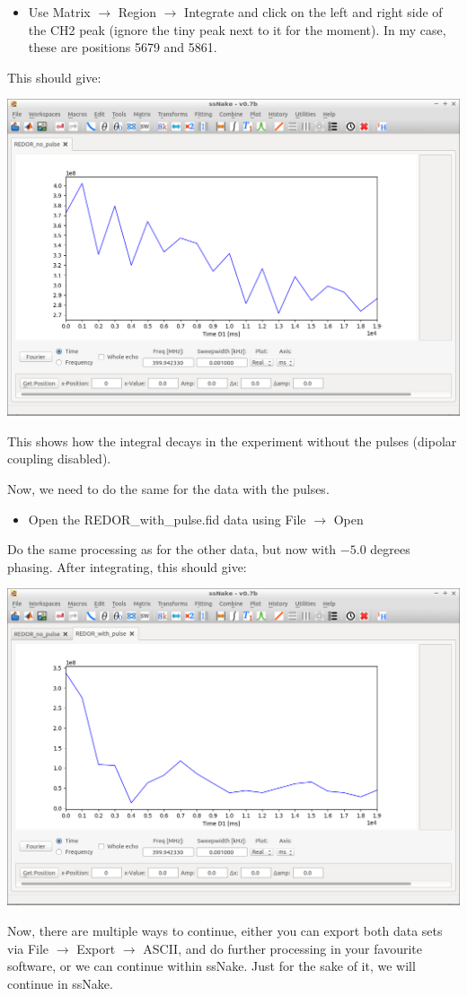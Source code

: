 \documentclass[11pt,a4paper]{article}
\begin{document}
\begin{itemize}
	\item Use Matrix $\longrightarrow$ Region $\longrightarrow$
Integrate and click on the left and right side of the CH2 peak (ignore the tiny peak next to it for
the moment). In my case, these are positions 5679 and 5861.
\end{itemize}
This should give:
\begin{center}
\includegraphics[width=0.8\linewidth]{Figs/Fig2.png}
\end{center}
This shows how the integral decays in the experiment without the pulses (dipolar coupling disabled).

Now, we need to do the same for the data with the pulses. 
\begin{itemize}
	\item Open the REDOR\_with\_pulse.fid data using File $\longrightarrow$ Open
\end{itemize}
Do the same processing as for the other data, but now with $-5.0$ degrees phasing. After
integrating, this should give:
\begin{center}
\includegraphics[width=0.8\linewidth]{Figs/Fig3.png}
\end{center}
Now, there are multiple ways to continue, either you can export both data sets via File
$\longrightarrow$ Export  $\longrightarrow$ ASCII, and do further processing in your favourite
software, or we can continue within ssNake. Just for the sake of it, we will continue in ssNake.
\end{document}
